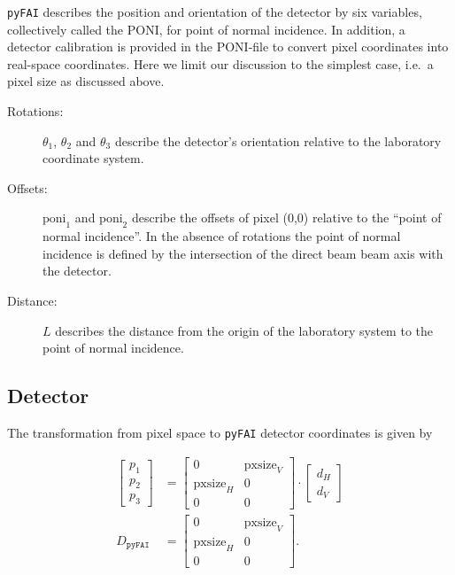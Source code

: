 \documentclass[12pt]{article}
\begin{document}
\texttt{pyFAI} describes the position and orientation of the detector
by six variables, collectively called the PONI, for point of normal
incidence. In addition, a detector calibration is provided in the
PONI-file to convert pixel coordinates into real-space
coordinates. Here we limit our discussion to the simplest case, i.e.~a
pixel size as discussed above.

\begin{description}
\item[Rotations:] $\theta_1$, $\theta_2$ and $\theta_3$ describe the
  detector's orientation relative to the laboratory coordinate system.

\item[Offsets:] $\mathrm{poni}_1$ and $\mathrm{poni}_2$ describe the
  offsets of pixel (0,0) relative to the ``point of normal
  incidence''. In the absence of rotations the point of normal
  incidence is defined by the intersection of the direct beam beam
  axis with the detector.

\item[Distance:] $L$ describes the distance from the origin of the
  laboratory system to the point of normal incidence.
\end{description}

\subsection{Detector}

The transformation from pixel space to \texttt{pyFAI} detector
coordinates is given by

\begin{align}
  \begin{bmatrix} p_1 \\ p_2 \\ p_3 \end{bmatrix}
  & =
  \begin{bmatrix}
    0 & \mathrm{pxsize}_V \\
    \mathrm{pxsize}_H & 0 \\
    0 & 0
  \end{bmatrix}
  \cdot
  \begin{bmatrix} d_H \\ d_V \end{bmatrix}
  \\
  D_{\mathtt{pyFAI}}
  & = 
  \begin{bmatrix}
    0 & \mathrm{pxsize}_V \\
    \mathrm{pxsize}_H & 0 \\
    0 & 0
  \end{bmatrix}.
  \label{eq-dmatrixpyFAI}
\end{align}
\end{document}
